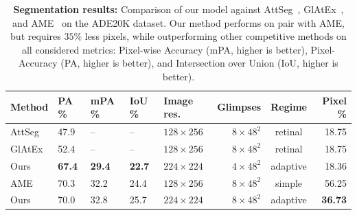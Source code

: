 \begin{table}[th]
\caption{\textbf{Segmentation results:} Comparison of our model against AttSeg~\protect\cite{seifi2020attend}, GlAtEx~\protect\cite{seifi2021glimpse}, and AME~\cite{pardyl2023active} on the ADE20K dataset. Our method performs on pair with AME, but requires $35\%$ less pixels, while outperforming other competitive methods on all considered metrics: Pixel-wise Accuracy (mPA, higher is better), Pixel-Accuracy (PA, higher is better), and Intersection over Union (IoU, higher is better).}
\vspace{-.2cm}
\label{tab:segmentation}
\begin{center}
\begin{small}
\begin{tabular}{l@{\hskip12pt}l@{\hskip12pt}l@{\hskip12pt}l@{\hskip12pt}l@{\hskip12pt}r@{\hskip12pt}c@{\hskip12pt}r}
\toprule
Method  & PA \% & mPA \% & IoU \%  & Image res. & Glimpses & Regime & Pixel \% \\
\midrule
AttSeg & 47.9 & -- & -- & $128 \times 256$ & $8 \times 48^2$ &retinal & 18.75  \\
GlAtEx & 52.4 & -- & -- & $128 \times 256$ & $8 \times 48^2$ & retinal & 18.75  \\
Ours & \textbf{67.4} & \textbf{29.4} & \textbf{22.7} & $224 \times 224$ & $4 \times 48^2$ & adaptive & 18.36 \\
\midrule
AME & 70.3 & 32.2 & 24.4 & $128 \times 256$ & $8 \times 48^2$ &simple & 56.25 \\
Ours & 70.0 & 32.8 & 25.7 & $224 \times 224$ & $8 \times 48^2$ & adaptive & \textbf{36.73}  \\
\bottomrule
\end{tabular}
\end{small}
\end{center}
\end{table}
